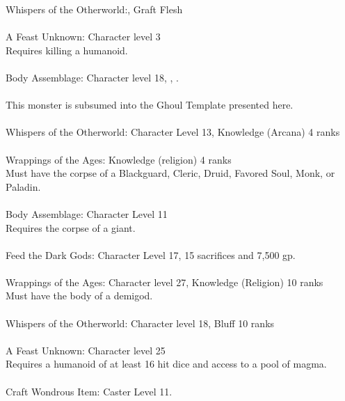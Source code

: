 \begin{multicols}{2}
\begin{small}
Whispers of the Otherworld:, Graft Flesh\\
\\
A Feast Unknown: Character level 3\\
Requires killing a humanoid.\\
\\
Body Assemblage: Character level 18, , .\\
\\
This monster is subsumed into the Ghoul Template presented here.\\
\\
Whispers of the Otherworld: Character Level 13, Knowledge (Arcana) 4 ranks\\
\\
Wrappings of the Ages: Knowledge (religion) 4 ranks\\
Must have the corpse of a Blackguard, Cleric, Druid, Favored Soul, Monk, or Paladin.\\
\\
Body Assemblage: Character Level 11\\
Requires the corpse of a giant.\\
\\
Feed the Dark Gods: Character Level 17, 15 sacrifices and 7,500 gp.\\
\\
Wrappings of the Ages: Character level 27, Knowledge (Religion) 10 ranks\\
Must have the body of a demigod.\\
\\
Whispers of the Otherworld: Character level 18, Bluff 10 ranks\\
\\
A Feast Unknown: Character level 25\\
Requires a humanoid of at least 16 hit dice and access to a pool of magma.\\
\\
Craft Wondrous Item: Caster Level 11.\\

\end{small}
\end{multicols}
